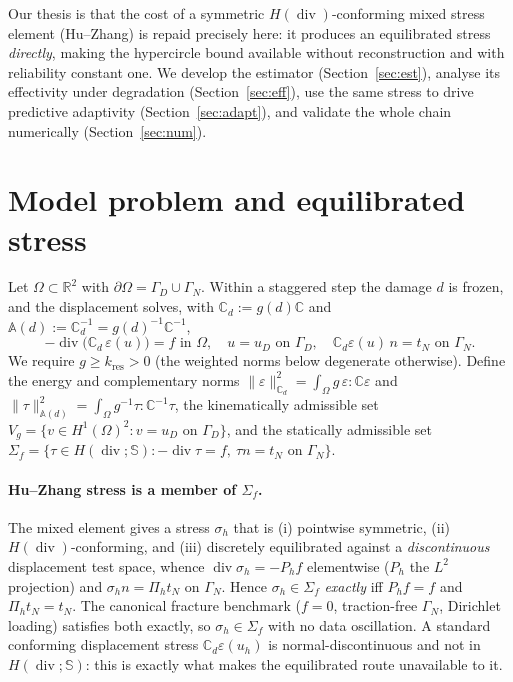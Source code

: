 \documentclass[11pt]{article}
\newcommand{\Om}{\Omega}
\newcommand{\eps}{\varepsilon}
\newcommand{\dv}{\operatorname{div}}
\newcommand{\CC}{\mathbb{C}}
\newcommand{\Cd}{\mathbb{C}_d}
\newcommand{\Ad}{\mathbb{A}(d)}
\newcommand{\Sig}{\mathbb{S}}
\newcommand{\Hdiv}{H(\dv;\Sig)}
\newcommand{\GN}{\Gamma_N}
\newcommand{\GD}{\Gamma_D}
\newcommand{\kres}{k_{\mathrm{res}}}
\begin{document}
Our thesis is that the cost of a symmetric $H(\dv)$-conforming mixed stress
element (Hu--Zhang) is repaid precisely here: it produces an equilibrated stress
\emph{directly}, making the hypercircle bound available without reconstruction
and with reliability constant one. We develop the estimator
(Section~\ref{sec:est}), analyse its effectivity under degradation
(Section~\ref{sec:eff}), use the same stress to drive predictive adaptivity
(Section~\ref{sec:adapt}), and validate the whole chain numerically
(Section~\ref{sec:num}).

\section{Model problem and equilibrated stress}\label{sec:model}
Let $\Om\subset\mathbb R^2$ with $\partial\Om=\GD\cup\GN$. Within a staggered
step the damage $d$ is frozen, and the displacement solves, with
$\Cd:=g(d)\CC$ and $\Ad:=\Cd^{-1}=g(d)^{-1}\CC^{-1}$,
\begin{equation}
-\dv\!\big(\Cd\,\eps(u)\big)=f \text{ in }\Om,\quad
u=u_D \text{ on }\GD,\quad \Cd\eps(u)\,n=t_N \text{ on }\GN.
\label{eq:strong}
\end{equation}
We require $g\ge\kres>0$ (the weighted norms below degenerate otherwise). Define
the energy and complementary norms
$\|\eps\|_{\Cd}^2=\int_\Om g\,\eps:\CC\eps$ and
$\|\tau\|_{\Ad}^2=\int_\Om g^{-1}\tau:\CC^{-1}\tau$, the kinematically
admissible set $V_g=\{v\in H^1(\Om)^2: v=u_D\text{ on }\GD\}$, and the
statically admissible set
$\Sigma_f=\{\tau\in\Hdiv: -\dv\tau=f,\ \tau n=t_N\text{ on }\GN\}$.

\paragraph{Hu--Zhang stress is a member of $\Sigma_f$.}
The mixed element gives a stress $\sigma_h$ that is (i) pointwise symmetric,
(ii) $H(\dv)$-conforming, and (iii) discretely equilibrated against a
\emph{discontinuous} displacement test space, whence
$\dv\sigma_h=-P_hf$ elementwise ($P_h$ the $L^2$ projection) and
$\sigma_h n=\Pi_h t_N$ on $\GN$. Hence $\sigma_h\in\Sigma_f$ \emph{exactly}
iff $P_hf=f$ and $\Pi_ht_N=t_N$. The canonical fracture benchmark
($f=0$, traction-free $\GN$, Dirichlet loading) satisfies both exactly, so
$\sigma_h\in\Sigma_f$ with no data oscillation. A standard conforming
displacement stress $\Cd\eps(u_h)$ is normal-discontinuous and not in $\Hdiv$:
this is exactly what makes the equilibrated route unavailable to it.
\end{document}
